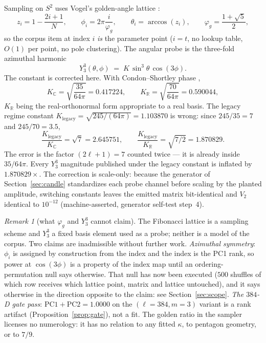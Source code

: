 \documentclass[11pt,a4paper]{article}
\theoremstyle{plain}
\theoremstyle{remark}
\newtheorem{remark}{Remark}
\theoremstyle{plain}
\begin{document}
Sampling on $S^2$ uses Vogel's golden-angle lattice \citep{vogel1979,saff1997}:
\begin{equation}
z_i=1-\frac{2i+1}{N},\qquad \phi_i=2\pi\frac{i}{\varphi_g},\qquad \theta_i=\arccos(z_i),\qquad \varphi_g=\frac{1+\sqrt5}{2},
\label{eq:fibonacci}
\end{equation}
so the corpus item at index $i$ \emph{is} the parameter point ($i=t$, no lookup table, $O(1)$ per point, no pole clustering). The angular probe is the three-fold azimuthal harmonic
\begin{equation}
Y_3^3(\theta,\phi)\;=\;K\,\sin^3\theta\,\cos(3\phi).
\label{eq:y33}
\end{equation}
The constant is corrected here. With Condon--Shortley phase \citep{dlmf},
\begin{equation}
K_{\mathbb{C}}=\sqrt{\frac{35}{64\pi}}=0.417224,\qquad
K_{\mathbb{R}}=\sqrt{\frac{70}{64\pi}}=0.590044,
\label{eq:y33const}
\end{equation}
$K_{\mathbb{R}}$ being the real-orthonormal form appropriate to a real basis. The legacy regime constant $K_{\mathrm{legacy}}=\sqrt{245/(64\pi)}=1.103870$ is wrong: since $245/35=7$ and $245/70=3.5$,
\begin{equation}
\frac{K_{\mathrm{legacy}}}{K_{\mathbb{C}}}=\sqrt7=2.645751,\qquad
\frac{K_{\mathrm{legacy}}}{K_{\mathbb{R}}}=\sqrt{7/2}=1.870829 .
\label{eq:y33ratio}
\end{equation}
The error is the factor $(2\ell+1)=7$ counted twice --- it is already inside $35/64\pi$. Every $Y_3^3$ magnitude published under the legacy constant is inflated by $1.870829\times$. The correction is scale-only: because the generator of Section~\ref{sec:candle} standardizes each probe channel before scaling by the planted amplitude, switching constants leaves the emitted matrix bit-identical and $V_2$ identical to $10^{-12}$ (machine-asserted, generator self-test step~4).

\begin{remark}[what $\varphi_g$ and $Y_3^3$ cannot claim]
\label{rem:phi-scope}
The Fibonacci lattice is a sampling scheme and $Y_3^3$ a fixed basis element used as a probe; neither is a model of the corpus. Two claims are inadmissible without further work. \emph{Azimuthal symmetry}: $\phi_i$ is assigned by construction from the index and the index is the PC1 rank, so power at $\cos(3\phi)$ is a property of the index map until an ordering-permutation null says otherwise. That null has now been executed ($500$ shuffles of which row receives which lattice point, matrix and lattice untouched), and it says otherwise in the direction opposite to the claim: see Section~\ref{sec:scope}. \emph{The $384$-D gate pass}: $\mathrm{PC1}+\mathrm{PC2}=1.0000$ on the $(\ell{=}384,m{=}3)$ variant is a rank artifact (Proposition~\ref{prop:gate}), not a fit. The golden ratio in the sampler licenses no numerology: it has no relation to any fitted $\kappa$, to pentagon geometry, or to $7/9$.
\end{remark}
\end{document}
